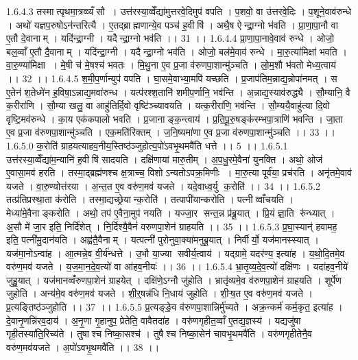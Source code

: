 1.6.4.3
तस्मात्पृथमा॒त्रव्व्यँसौ । उत्त॑रस्या॒व्वेँद्या॑मुत्तरवे॒दिमुप॑ वपति । प॒शवो॒ वा उ॑त्तरवे॒दिः । प॒शूने॒वाव॑रुन्धे । अथो॑ यज्ञप॒रुषोऽन॑न्तरित्यै । ए॒तद्ब्राह्मणान्ये॒व पञ्च॑ ह॒वीषि॑ । अथै॒ष ऐन्द्रा॒ग्नो भ॑वति । प्रा॒णा॒पा॒नौ वा ए॒तौ दे॒वानाम् । यदि॑न्द्रा॒ग्नी । यदैन्द्रा॒ग्नो भव॑ति ।। 31 ।।
1.6.4.4
प्रा॒णा॒पा॒नावे॒वाव॑ रुन्धे । ओजो॒ बल॒व्वाँ ए॒तौ दै॒वानाम् । यदि॑न्द्रा॒ग्नी । यदैन्द्रा॒ग्नो भव॑ति । ओजो॒ बल॑मे॒वाव॑ रुन्धे । मा॒रु॒त्या॑मिक्षा॑ भवति । वा॒रु॒ण्या॑मिक्षा । मे॒षी च॑ मे॒षश्च॑ भवतः । मि॒थु॒ना ए॒व प्र॒जा व॑रुणपा॒शान्मु॑ञ्चति । लो॒म॒शौ भ॑वतो मेध्य॒त्वाय॑ ।। 32 ।।
1.6.4.5
श॒मी॒प॒र्णान्युप॑ वपति । घा॒समे॒वाभ्या॒मपि॑ यच्छति । प्र॒जाप॑तिम॒न्नाद्य॒न्नोपा॑नमत् । स ए॒तेन॑ श॒तेध्मे॑न ह॒विषा॒ऽन्नाद्य॒मवा॑रुन्ध । यत्प॑रश्श॒तानि॑ शमीप॒र्णानि॒ भव॑न्ति । अ॒न्नाद्य॒स्याव॑रुद्ध्यै । सौ॒म्यानि॒ वै क॒रीरा॑णि । सौ॒म्या खलु॒ वा आहु॑तिर्दि॒वो वृष्टि॑ञ्च्यावयति । यत्क॒रीरा॑णि॒ भव॑न्ति । सौ॒म्ययै॒वाहु॑त्या दि॒वो वृष्टि॒मव॑रुन्धे । का॒य एक॑कपालो भवति । प्र॒जानाङ्क॒न्त्वाय॑ । प्र॒ति॒पू॒रु॒षङ्क॑रम्भपा॒त्राणि॑ भवन्ति । जा॒ता ए॒व प्र॒जा व॑रुणपा॒शान्मु॑ञ्चति । एक॒मति॑रिक्तम् । ज॒नि॒ष्यमा॑णा ए॒व प्र॒जा व॑रुणपा॒शान्मु॑ञ्चति ।। 33 ।।
1.6.5.0
क॒रोति॑ ग्राहयत्याहव॒नीय॒स्तिष्ठ॑ञ्जुहोत्य॒पो॑ऽवभृ॒थमवै॑ति धत्ते ।। 5 ।।
1.6.5.1
उत्त॑रस्या॒व्वेँद्या॑म॒न्यानि॑ ह॒वीषि॑ सादयति । दक्षि॑णायां मारु॒तीम् । अ॒प॒धु॒रमे॒वैना॑ युनक्ति । अथो॒ ओज॑ ए॒वासा॒मव॑ हरति । तस्मा॒द्ब्रह्म॑णश्च क्ष॒त्राच्च॒ विशोऽन्यतोऽपक्र॒मिणीः । मा॒रु॒त्या पूर्व॑या॒ प्रच॑रति । अनृ॑तमे॒वाव॑ यजते । वा॒रु॒ण्योत्त॑रया । अ॒न्त॒त ए॒व वरु॑ण॒मव॑ यजते । यदे॒वाध्व॒र्यु क॒रोति॑ ।। 34 ।।
1.6.5.2
तत्प्र॑तिप्रस्था॒ता क॑रोति । तस्मा॒द्यच्छ्रेयान्क॒रोति॑ । तत्पापी॑यान्करोति । पत्नीव्वाँचयति । मेध्या॑मे॒वैनाङ्करोति । अथो॒ तप॑ ए॒वैना॒मुप॑ नयति । यज्जा॒र सन्त॒न्न प्र॑ब्रू॒यात् । प्रि॒यं ज्ञा॒ति रु॑न्ध्यात् । अ॒सौ मे॑ जा॒र इति॒ निर्दि॑शेत् । नि॒र्दिश्यै॒वैनं॑ वरुणपा॒शेन॑ ग्राहयति ।। 35 ।।
1.6.5.3
प्र॒घा॒स्यान्॑ हवामह॒ इति॒ पत्नी॑मु॒दान॑यति । अह्व॑तै॒वैनाम् । यत्पत्नी॑ पुरोनुवा॒क्या॑मनुब्रू॒यात् । निर्वीर्यो॒ यज॑मानस्स्यात् । यज॑मा॒नोऽन्वा॑ह । आ॒त्मन्ने॒व वी॒र्य॑न्धत्ते । उ॒भौ या॒ज्या॑ सवीर्य॒त्वाय॑ । यद्ग्रामे॒ यदर॑ण्य॒ इत्या॑ह । य॒थो॒दि॒तमे॒व वरु॑ण॒मव॑ यजते । य॒ज॒मा॒न॒दे॒व॒त्यो॑ वा आ॑हव॒नीयः॑ ।। 36 ।।
1.6.5.4
भ्रा॒तृ॒व्य॒दे॒व॒त्यो॑ दक्षि॑णः । यदा॑हव॒नीये॑ जुहु॒यात् । यज॑मानव्वँरुणपा॒शेन॑ ग्राहयेत् । दक्षि॑णे॒ऽग्नौ जु॑होति । भ्रातृ॑व्यमे॒व व॑रुणपा॒शेन॑ ग्राहयति । शूर्पे॑ण जुहोति । अन्य॑मे॒व वरु॑ण॒मव॑ यजते । शी॒र्॒षन्न॑धि नि॒धाय॑ जुहोति । शी॒ऱ्ष॒त ए॒व वरु॑ण॒मव॑ यजते । प्र॒त्यङ्तिष्ठ॑ञ्जुहोति ।। 37 ।।
1.6.5.5
प्र॒त्यङ्ङे॒व व॑रुणपा॒शान्निर्मु॑च्यते । अक्र॒न्कर्म॑ कर्म॒कृत॒ इत्या॑ह । दे॒वानृ॒णन्नि॑रव॒दाय॑ । अ॒नृ॒णा गृ॒हानुप॒ प्रेतेति॒ वावैतदा॑ह । वरु॑णगृहीत॒व्वाँ ए॒तद्य॒ज्ञस्य॑ । यद्यजु॑षा गृही॒तस्या॑ति॒रिच्य॑ते । तुषाश्च निष्का॒सश्च॑ । तुषैश्च निष्का॒सेन॑ चावभृ॒थमवै॑ति । वरु॑णगृहीतेनै॒व वरु॑ण॒मव॑यजते । अ॒पो॑ऽवभृ॒थमवै॑ति ।। 38 ।।
